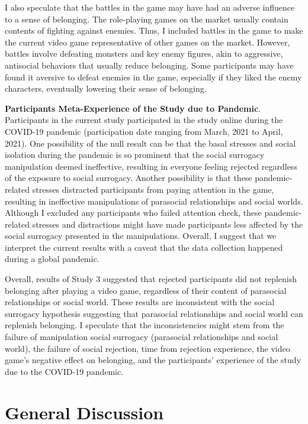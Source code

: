 \documentclass[
]{udthesis}
\begin{document}
I also speculate that the battles in the game may have had an adverse
influence to a sense of belonging. The role-playing games on the market
usually contain contents of fighting against enemies. Thus, I included
battles in the game to make the current video game representative of
other games on the market. However, battles involve defeating monsters
and key enemy figures, akin to aggressive, antisocial behaviors that
usually reduce belonging. Some participants may have found it aversive
to defeat enemies in the game, especially if they liked the enemy
characters, eventually lowering their sense of belonging.

\textbf{Participants Meta-Experience of the Study due to Pandemic}.
Participants in the current study participated in the study online
during the COVID-19 pandemic (participation date ranging from
March, 2021 to
April, 2021). One possibility of
the null result can be that the basal stresses and social isolation
during the pandemic is so prominent that the social surrogacy
manipulation deemed ineffective, resulting in everyone feeling rejected
regardless of the exposure to social surrogacy. Another possibility is
that these pandemic-related stresses distracted participants from paying
attention in the game, resulting in ineffective manipulations of
parasocial relationships and social worlds. Although I excluded any
participants who failed attention check, these pandemic-related stresses
and distractions might have made participants less affected by the
social surrogacy presented in the manipulations. Overall, I suggest that
we interpret the current results with a caveat that the data collection
happened during a global pandemic.

Overall, results of Study 3 suggested that rejected participants did not
replenish belonging after playing a video game, regardless of their
content of parasocial relationships or social world. These results are
inconsistent with the social surrogacy hypothesis suggesting that
parasocial relationships and social world can replenish belonging. I
speculate that the inconsistencies might stem from the failure of
manipulation social surrogacy (parasocial relationships and social
world), the failure of social rejection, time from rejection experience,
the video game's negative effect on belonging, and the participants'
experience of the study due to the COVID-19 pandemic.

\chapter{General Discussion}\label{general-discussion}
\end{document}

